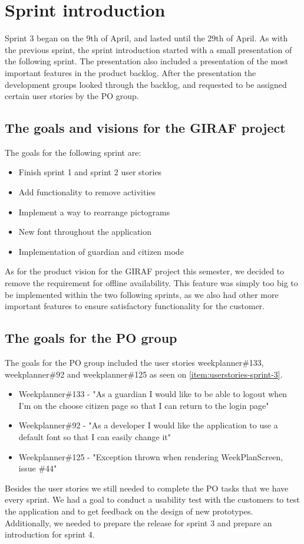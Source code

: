\section{Sprint introduction}
Sprint 3 began on the 9th of April, and lasted until the 29th of April.
As with the previous sprint, the sprint introduction started with a small presentation of the following sprint. 
The presentation also included a presentation of the most important features in the product backlog.
After the presentation the development groups looked through the backlog, and requested to be assigned certain user stories by the PO group.

\subsection{The goals and visions for the GIRAF project}
The goals for the following sprint are:

\begin{itemize}
    \item Finish sprint 1 and sprint 2 user stories
    \item Add functionality to remove activities
    \item Implement a way to rearrange pictograms
    \item New font throughout the application
    \item Implementation of guardian and citizen mode
\end{itemize}

\noindent
As for the product vision for the GIRAF project this semester, we decided to remove the requirement for offline availability. 
This feature was simply too big to be implemented within the two following sprints, as we also had other more important features to ensure satisfactory functionality for the customer.

\subsection{The goals for the PO group}\label{sprint-3-po-goals}
The goals for the PO group included the user stories weekplanner\#133, weekplanner\#92 and weekplanner\#125 as seen on \autoref{item:userstories-sprint-3}.

\begin{itemize}\label{item:userstories-sprint-3}
    \item Weekplanner\#133 - "As a guardian I would like to be able to logout when I'm on the choose citizen page so that I can return to the login page"
    \item Weekplanner\#92 - "As a developer I would like the application to use a default font so that I can easily change it"
    \item Weekplanner\#125 - "Exception thrown when rendering WeekPlanScreen, issue \#44"
\end{itemize}
\noindent
Besides the user stories we still needed to complete the PO tasks that we have every sprint.
We had a goal to conduct a usability test with the customers to test the application and to get feedback on the design of new prototypes.
Additionally, we needed to prepare the release for sprint 3 and prepare an introduction for sprint 4.

